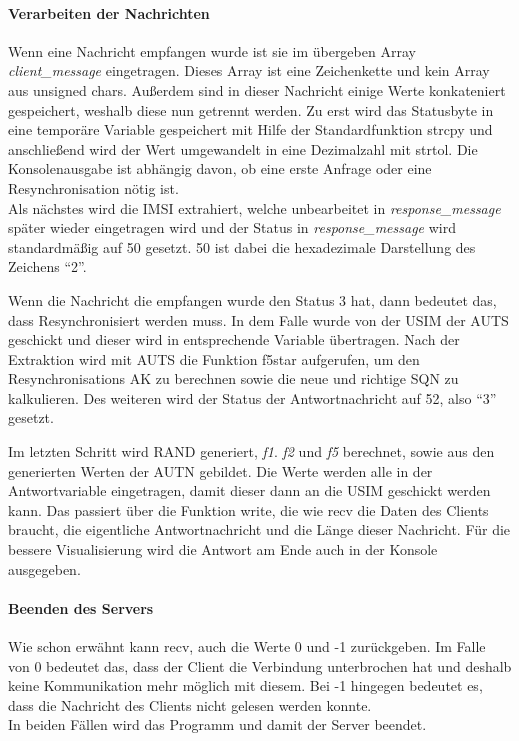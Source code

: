 		\paragraph{Verarbeiten der Nachrichten}
		Wenn eine Nachricht empfangen wurde ist sie im übergeben Array \emph{client\_message} eingetragen. Dieses
		Array ist eine Zeichenkette und kein Array aus unsigned chars. Außerdem sind in dieser Nachricht einige
		Werte konkateniert gespeichert, weshalb diese nun getrennt werden. Zu erst wird das Statusbyte in eine
		temporäre Variable gespeichert mit Hilfe der Standardfunktion strcpy und anschließend wird der Wert
		umgewandelt in eine Dezimalzahl mit strtol. Die Konsolenausgabe ist abhängig davon, ob eine erste Anfrage
		oder eine Resynchronisation nötig ist. \\
		Als nächstes wird die IMSI extrahiert, welche unbearbeitet in \emph{response\_message} später wieder
		eingetragen wird und der Status in \emph{response\_message} wird standardmäßig auf 50 gesetzt. 50 ist
		dabei die hexadezimale Darstellung des Zeichens ``2''.
		
		Wenn die Nachricht die empfangen wurde den Status 3 hat, dann bedeutet das, dass Resynchronisiert werden
		muss. In dem Falle wurde von der USIM der AUTS geschickt und dieser wird in entsprechende Variable übertragen.
		Nach der Extraktion wird mit AUTS die Funktion f5star aufgerufen, um den Resynchronisations AK zu berechnen
		sowie die neue und richtige SQN zu kalkulieren. Des weiteren wird der Status der Antwortnachricht auf 52, also ``3''
		gesetzt.
		
		Im letzten Schritt wird RAND generiert, \emph{f1}. \emph{f2} und \emph{f5} berechnet, sowie aus den generierten
		Werten der AUTN gebildet. Die Werte werden alle in der Antwortvariable eingetragen, damit dieser dann an die USIM
		geschickt werden kann. Das passiert über die Funktion write, die wie recv die Daten des Clients braucht, die eigentliche
		Antwortnachricht und die Länge dieser Nachricht. Für die bessere Visualisierung wird die Antwort am Ende auch in
		der Konsole ausgegeben.
		
		\paragraph{Beenden des Servers}
		Wie schon erwähnt kann recv, auch die Werte 0 und -1 zurückgeben. Im Falle von 0 bedeutet das, dass der Client
		die Verbindung unterbrochen hat und deshalb keine Kommunikation mehr möglich mit diesem. Bei -1 hingegen bedeutet
		es, dass die Nachricht des Clients nicht gelesen werden konnte. \\
		In beiden Fällen wird das Programm und damit der Server beendet.

